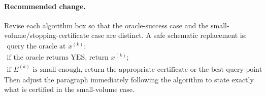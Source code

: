 \documentclass{article}
\begin{document}
\paragraph{Recommended change.}
Revise each algorithm box so that the oracle-success case and the
small-volume/stopping-certificate case are distinct.  A safe schematic
replacement is:
\[
\begin{array}{l}
\text{query the oracle at } x^{(k)};\\
\text{if the oracle returns YES, return } x^{(k)};\\
\text{if } E^{(k)} \text{ is small enough, return the appropriate certificate
or the best query point maintained so far.}
\end{array}
\]
Then adjust the paragraph immediately following the algorithm to state exactly
what is certified in the small-volume case.
\end{document}
